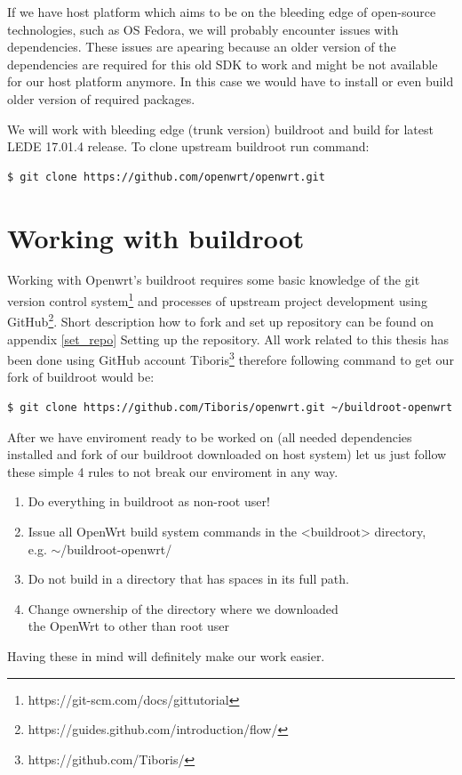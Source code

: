 If we have host platform which aims to be on the bleeding edge of open-source technologies, such as OS Fedora, we will probably encounter issues with dependencies.
These issues are apearing because an older version of the dependencies are required for this old SDK to work and might be not available for our host platform anymore.
In this case we would have to install or even build older version of required packages.

We will work with bleeding edge (trunk version) buildroot and build for latest LEDE 17.01.4 release.
To clone upstream buildroot run command:
\begin{lstlisting}[columns=fixed,basicstyle=\ttfamily\footnotesize,tabsize=4,backgroundcolor=\color{yellow!10}]
$ git clone https://github.com/openwrt/openwrt.git
\end{lstlisting}

\section{Working with buildroot}\label{working-with-buildroot}

Working with Openwrt's buildroot requires some basic knowledge of the git version control system\footnote{https://git-scm.com/docs/gittutorial} and processes of upstream project development using GitHub\footnote{https://guides.github.com/introduction/flow/}.
Short description how to fork and set up repository can be found on appendix \ref{set_repo} Setting up the repository.
All work related to this thesis has been done using GitHub account Tiboris\footnote{https://github.com/Tiboris/} therefore following command to get our fork of buildroot would be:
\begin{lstlisting}[columns=fixed,basicstyle=\ttfamily\footnotesize,tabsize=4,backgroundcolor=\color{yellow!10}]
$ git clone https://github.com/Tiboris/openwrt.git ~/buildroot-openwrt
\end{lstlisting}

After we have enviroment ready to be worked on (all needed dependencies installed and fork of our buildroot downloaded on host system) let us just follow these simple 4 rules to not break our enviroment in any way.
\begin{enumerate}
    \item Do everything in buildroot as non-root user!
    \item Issue all OpenWrt build system commands in the <buildroot> directory, \\e.g. $\sim$/buildroot-openwrt/
    \item Do not build in a directory that has spaces in its full path.
    \item Change ownership of the directory where we downloaded \\the OpenWrt to other than root user
\end{enumerate}
Having these in mind will definitely make our work easier.



